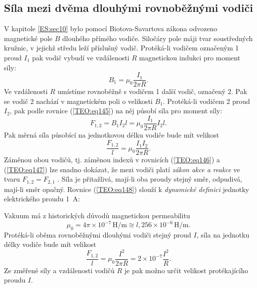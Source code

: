     \subsection{Síla mezi dvěma dlouhými rovnoběžnými vodiči}      
      V kapitole \ref{ES:sec10} bylo pomocí Biotova-Savartova zákona odvozeno magnetické pole \(B\) 
      dlouhého přímého vodiče. Siločáry pole máji tvar soustředných kružnic, v jejichž středu leží 
      příslušný vodič. Protéká-li vodičem označeným 1 proud \(I_1\) pak vodič vybudí ve vzdálenosti 
      \(R\) magnetickou indukci
      pro moment síly:
      \begin{equation}\label{TEO:eq146}
        B_1 = \mu_0\frac{I_1}{2\pi R}.
      \end{equation}
      Ve vzdálenosti \(R\) umístíme rovnoběžně s vodičem 1 další vodič, označený 2. Pak se vodič 2 
      nachází v magnetickém poli o velikosti \(B_1\). Protéká-li vodičem 2 proud \(I_2\), pak podle 
      rovnice (\ref{TEO:eq145}) na něj působí síla
       pro moment síly:
      \begin{equation}\label{TEO:eq147}
        F_{1,2} = B_1 I_2 l = \mu_0\frac{I_1}{2\pi R}I_2 l.
      \end{equation}
      Pak měrná síla působící na jednotkovou délku vodiče bude mít velikost
      \begin{equation}\label{TEO:eq148}
        \frac{F_{1,2}}{l} = \mu_0\frac{I_1I_2}{2\pi R}.
      \end{equation}
      Záměnou obou vodičů, tj. záměnou indexů v rovnicích (\ref{TEO:eq146}) a 
      (\ref{TEO:eq147}) lze snadno dokázat, že mezi vodiči platí \emph{zákon akce a reakce} 
      ve tvaru \(F_{1,2} = F_{2,1}\) . Síla je přitažlivá, mají-li oba proudy stejný směr, 
      odpudivá, mají-li směr opačný. Rovnice (\ref{TEO:eq148}) slouží k \emph{dynamické 
      definici} jednotky elektrického proudu \SI{1}{\A}:
      
      Vakuum má z historických důvodů magnetickou permeabilitu
      \begin{equation*}
        \mu_0= 4\pi\times10^{-7}\,\si{\henry/\m} \cong l,256\times10^{-6}\,\si{\henry/\m}.
      \end{equation*}
      Protéká-li oběma rovnoběžnými dlouhými vodiči stejný proud \(I\), síla na jednotku délky 
      vodiče bude mít velikost
      \begin{equation*}
        \frac{F_{1,2}}{l} = \mu_0\frac{I^2}{2\pi R} = 2\times10^{-7}\frac{I^2}{R}.
      \end{equation*}
      Ze změřené síly a vzdálenosti vodičů \(R\) je pak možno určit velikost protékajícího proudu 
      \(I\).
